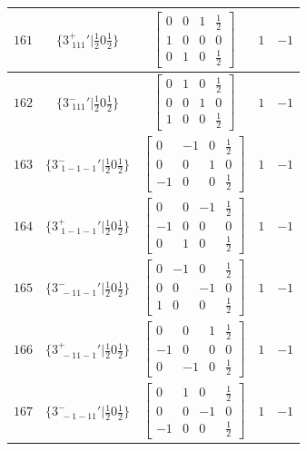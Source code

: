 \documentclass[fleqn,8pt]{jsarticle}
\begin{document}
\begin{longtable}{ccccc}
$ 161 $ & $ \{3^{+}_{\,\,111}{}'|\frac{1}{2} 0 \frac{1}{2}\} $ & $ \begin{bmatrix} 0 & 0 & 1 & \frac{1}{2} \\ 1 & 0 & 0 & 0 \\ 0 & 1 & 0 & \frac{1}{2} \end{bmatrix} $ & $ 1 $ & $ -1 $ \\ \hline
$ 162 $ & $ \{3^{-}_{\,\,111}{}'|\frac{1}{2} 0 \frac{1}{2}\} $ & $ \begin{bmatrix} 0 & 1 & 0 & \frac{1}{2} \\ 0 & 0 & 1 & 0 \\ 1 & 0 & 0 & \frac{1}{2} \end{bmatrix} $ & $ 1 $ & $ -1 $ \\ \hline
$ 163 $ & $ \{3^{-}_{\,\,1-1-1}{}'|\frac{1}{2} 0 \frac{1}{2}\} $ & $ \begin{bmatrix} 0 & -1 & 0 & \frac{1}{2} \\ 0 & 0 & 1 & 0 \\ -1 & 0 & 0 & \frac{1}{2} \end{bmatrix} $ & $ 1 $ & $ -1 $ \\ \hline
$ 164 $ & $ \{3^{+}_{\,\,1-1-1}{}'|\frac{1}{2} 0 \frac{1}{2}\} $ & $ \begin{bmatrix} 0 & 0 & -1 & \frac{1}{2} \\ -1 & 0 & 0 & 0 \\ 0 & 1 & 0 & \frac{1}{2} \end{bmatrix} $ & $ 1 $ & $ -1 $ \\ \hline
$ 165 $ & $ \{3^{-}_{\,\,-11-1}{}'|\frac{1}{2} 0 \frac{1}{2}\} $ & $ \begin{bmatrix} 0 & -1 & 0 & \frac{1}{2} \\ 0 & 0 & -1 & 0 \\ 1 & 0 & 0 & \frac{1}{2} \end{bmatrix} $ & $ 1 $ & $ -1 $ \\ \hline
$ 166 $ & $ \{3^{+}_{\,\,-11-1}{}'|\frac{1}{2} 0 \frac{1}{2}\} $ & $ \begin{bmatrix} 0 & 0 & 1 & \frac{1}{2} \\ -1 & 0 & 0 & 0 \\ 0 & -1 & 0 & \frac{1}{2} \end{bmatrix} $ & $ 1 $ & $ -1 $ \\ \hline
$ 167 $ & $ \{3^{-}_{\,\,-1-11}{}'|\frac{1}{2} 0 \frac{1}{2}\} $ & $ \begin{bmatrix} 0 & 1 & 0 & \frac{1}{2} \\ 0 & 0 & -1 & 0 \\ -1 & 0 & 0 & \frac{1}{2} \end{bmatrix} $ & $ 1 $ & $ -1 $ \\ \hline

\end{longtable}
\end{document}
